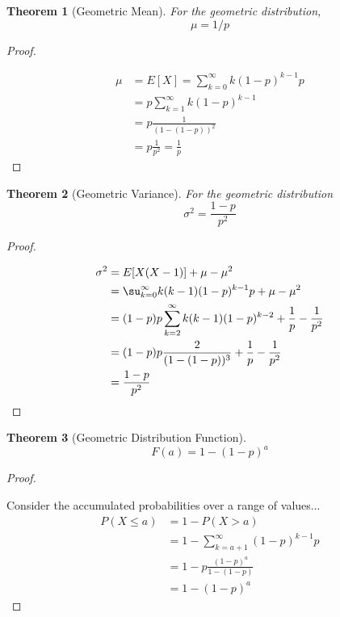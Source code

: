 \documentclass[10pt,]{book}
\theoremstyle{plain}
\newtheorem{theorem}{Theorem}[section]
\theoremstyle{definition}
\theoremstyle{definition}
\theoremstyle{definition}
\numberwithin{equation}{section}
\newcommand{\gt}{ > }
\begin{document}
\begin{theorem}[{Geometric Mean}]\label{theorem-42}
For the geometric distribution, 
			\begin{equation*}\mu = 1/p\end{equation*}\end{theorem}
\begin{proof}\hypertarget{proof-39}{}
 
			\begin{align*}
\mu & = E[X] = \sum_{k=0}^{\infty} {k(1-p)^{k-1}p}\\
 & = p \sum_{k=1}^{\infty} {k(1-p)^{k-1}}\\
 & = p \frac{1}{(1-(1-p))^2}\\
 & = p \frac{1}{p^2} = \frac{1}{p}
\end{align*}
\end{proof}
\begin{theorem}[{Geometric Variance}]\label{theorem-43}
For the geometric distribution 
				\begin{equation*}\sigma^2  = \frac{1-p}{p^2}\end{equation*}\end{theorem}
\begin{proof}\hypertarget{proof-40}{}
 
			\begin{align*}
\sigma^2 & = E[X(X-1)] + \mu - \mu^2 \\
 & = \su _{k=0}^{\infty} {k(k-1)(1-p)^{k-1}p} + \mu - \mu^2 \\
 & = (1-p)p \sum_{k=2}^{\infty} {k(k-1)(1-p)^{k-2}} + \frac{1}{p} - \frac{1}{p^2}\\
 & = (1-p)p \frac{2}{(1-(1-p))^3} + \frac{1}{p} - \frac{1}{p^2}\\
 & = \frac{1-p}{p^2}
\end{align*}
\end{proof}
\begin{theorem}[{Geometric Distribution Function}]\label{theorem-44}
\begin{equation*}F(a) =  1- (1-p)^{a}\end{equation*}\end{theorem}
\begin{proof}\hypertarget{proof-41}{}
 Consider the accumulated probabilities over a range of values...
		\begin{align*}
 P(X \le a) & = 1 - P(X \gt a)\\
 & = 1- \sum_{k={a+1}}^{\infty} {(1-p)^{k-1}p}\\
 & = 1- p \frac{(1-p)^{a}}{1-(1-p)}\\
 & = 1- (1-p)^{a}
\end{align*}
\end{proof}
\end{document}
